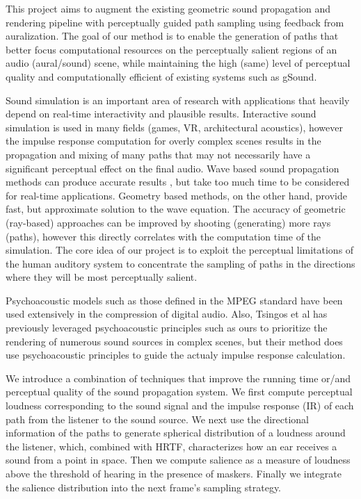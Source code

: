 This project aims to augment the existing geometric sound propagation and rendering pipeline with perceptually guided path sampling using feedback from auralization. The goal of our method is to enable the generation of paths that better focus computational resources on the perceptually salient regions of an audio (aural/sound) scene, while maintaining the high (same) level of perceptual quality and computationally efficient of existing systems such as gSound.

Sound simulation is an important area of research with applications that heavily depend on real-time interactivity and plausible results. Interactive sound simulation is used in many fields (games, VR, architectural acoustics), however the impulse response computation for overly complex scenes results in the propagation and mixing of many paths that may not necessarily have a significant perceptual effect on the final audio. Wave based sound propagation methods can produce accurate results \cite{waves}, but take too much time to be considered for real-time applications. Geometry based methods, on the other hand, provide fast, but approximate solution to the wave equation. The accuracy of geometric (ray-based) approaches can be improved by shooting (generating) more rays (paths), however this directly correlates with the computation time of the simulation. The core idea of our project is to exploit the perceptual limitations of the human auditory system to concentrate the sampling of paths in the directions where they will be most perceptually salient.

Psychoacoustic models such as those defined in the MPEG standard have been used extensively in the compression of digital audio.
Also, Tsingos et al has previously leveraged psychoacoustic principles such as ours to prioritize the rendering of numerous sound sources in complex scenes, but their method does use psychoacoustic principles to guide the actualy impulse response calculation.

We introduce a combination of techniques that improve the running time or/and perceptual quality of the sound propagation system. We first compute perceptual loudness corresponding to the sound signal and the impulse response (IR) of each path from the listener to the sound source. We next use the directional information of the paths to generate spherical distribution of a loudness around the listener, which, combined with HRTF, characterizes how an ear receives a sound from a point in space. Then we compute salience as a measure of loudness above the threshold of hearing in the presence of maskers. Finally  we integrate the salience distribution into the next frame's sampling strategy.

